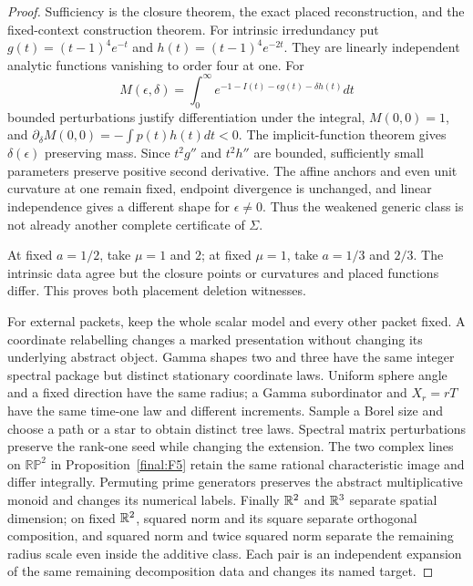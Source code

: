 \begin{proof}
Sufficiency is the closure theorem, the exact placed reconstruction,
and the fixed-context construction theorem. For intrinsic irredundancy
put $g(t)=(t-1)^4e^{-t}$ and $h(t)=(t-1)^4e^{-2t}$. They are linearly
independent analytic functions vanishing to order four at one.
For
\[
 M(\epsilon,\delta)=\int_0^\infty
 e^{-1-I(t)-\epsilon g(t)-\delta h(t)}dt
\]
bounded perturbations justify differentiation under the integral,
$M(0,0)=1$, and
$\partial_\delta M(0,0)=-\int p(t)h(t)dt<0$.
The implicit-function theorem gives $\delta(\epsilon)$ preserving
mass. Since $t^2g''$ and $t^2h''$ are bounded, sufficiently small
parameters preserve positive second derivative. The affine anchors
and even unit curvature at one remain fixed, endpoint divergence is
unchanged, and linear independence gives a different shape for
$\epsilon\ne0$. Thus the weakened generic class is not already
another complete certificate of $\Sigma$.

At fixed $a=1/2$, take $\mu=1$ and $2$; at fixed $\mu=1$, take
$a=1/3$ and $2/3$. The intrinsic data agree but the closure points
or curvatures and placed functions differ. This proves both placement
deletion witnesses.

For external packets, keep the whole scalar model and every other
packet fixed. A coordinate relabelling changes a marked presentation
without changing its underlying abstract object. Gamma shapes two and
three have the same integer spectral package but distinct stationary
coordinate laws. Uniform sphere angle and a fixed direction have the
same radius; a Gamma subordinator and $X_r=rT$ have the same time-one
law and different increments. Sample a Borel size and choose a path
or a star to obtain distinct tree laws. Spectral matrix perturbations
preserve the rank-one seed while changing the extension. The two
complex lines on $\mathbb{RP}^2$ in Proposition~\ref{final:F5} retain the
same rational characteristic image and differ integrally. Permuting
prime generators preserves the abstract multiplicative monoid and
changes its numerical labels. Finally $\mathbb R^2$ and $\mathbb R^3$ separate
spatial dimension; on fixed $\mathbb R^2$, squared norm and its square
separate orthogonal composition, and squared norm and twice squared
norm separate the remaining radius scale even inside the additive
class. Each pair is an independent expansion of the same remaining
decomposition data and changes its named target.
\end{proof}


